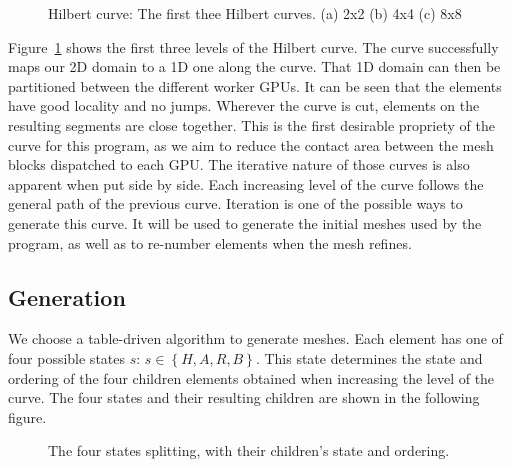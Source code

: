 \begin{figure}[H]
	\centering
	\hfill
	\hfill
	\caption{Hilbert curve: The first thee Hilbert curves. (a) 2x2 (b) 4x4 (c) 8x8}
	\label{fig:hilbert_curves}
\end{figure}

Figure~\ref{fig:hilbert_curves} shows the first three levels of the Hilbert curve. The curve
successfully maps our 2D domain to a 1D one along the curve. That 1D domain can then be partitioned
between the different worker GPUs. It can be seen that the elements have good locality and no jumps. 
Wherever the curve is cut, elements on the resulting segments are close together. This is the first 
desirable propriety of the curve for this program, as we aim to reduce the contact area between 
the mesh blocks dispatched to each GPU. The iterative nature of those curves is also apparent when
put side by side. Each increasing level of the curve follows the general path of the previous curve.
Iteration is one of the possible ways to generate this curve. It will be used to generate the
initial meshes used by the program, as well as to re-number elements when the mesh refines.

\subsection{Generation} \label{section:load_balancing:hilbert_curve:generation}
We choose a table-driven algorithm to generate meshes. Each element has one of four possible states
$s$: $s \in \left \{H, A, R, B \right \}$. This state determines the state and ordering of the four children
elements obtained when increasing the level of the curve. The four states and their resulting
children are shown in the following figure.

\begin{figure}[H]
	\centering
	\hfill
	\hfill
	\hfill
	\caption{The four states splitting, with their children's state and ordering.}
	\label{fig:hilbert_splits}
\end{figure}

